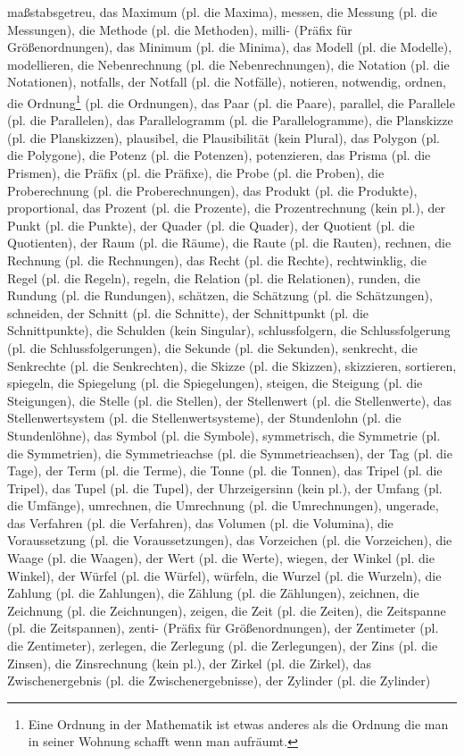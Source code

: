 maßstabsgetreu,
das Maximum (pl. die Maxima),
messen,
die Messung (pl. die Messungen),
die Methode (pl. die Methoden),
milli- (Präfix für Größenordnungen),
das Minimum (pl. die Minima),
das Modell (pl. die Modelle),
modellieren,
die Nebenrechnung (pl. die Nebenrechnungen),
die Notation (pl. die Notationen),
notfalls,
der Notfall (pl. die Notfälle),
notieren,
notwendig,
ordnen,
die Ordnung\footnote{Eine Ordnung in der Mathematik ist etwas anderes als die Ordnung die man in seiner Wohnung schafft wenn man aufräumt.} (pl. die Ordnungen),
das Paar (pl. die Paare),
parallel,
die Parallele (pl. die Parallelen),
das Parallelogramm (pl. die Parallelogramme),
die Planskizze (pl. die Planskizzen),
plausibel,
die Plausibilität (kein Plural),
das Polygon (pl. die Polygone),
die Potenz (pl. die Potenzen),
potenzieren,
das Prisma (pl. die Prismen),
die Präfix (pl. die Präfixe),
die Probe (pl. die Proben),
die Proberechnung (pl. die Proberechnungen),
das Produkt (pl. die Produkte),
proportional,
das Prozent (pl. die Prozente),
die Prozentrechnung (kein pl.),
der Punkt (pl. die Punkte),
der Quader (pl. die Quader),
der Quotient (pl. die Quotienten),
der Raum (pl. die Räume),
die Raute (pl. die Rauten),
rechnen,
die Rechnung (pl. die Rechnungen),
das Recht (pl. die Rechte),
rechtwinklig,
die Regel (pl. die Regeln),
regeln,
die Relation (pl. die Relationen),
runden,
die Rundung (pl. die Rundungen),
schätzen,
die Schätzung (pl. die Schätzungen),
schneiden,
der Schnitt (pl. die Schnitte),
der Schnittpunkt (pl. die Schnittpunkte),
die Schulden (kein Singular),
schlussfolgern,
die Schlussfolgerung (pl. die Schlussfolgerungen),
die Sekunde (pl. die Sekunden),
senkrecht,
die Senkrechte (pl. die Senkrechten),
die Skizze (pl. die Skizzen),
skizzieren,
sortieren,
spiegeln,
die Spiegelung (pl. die Spiegelungen),
steigen,
die Steigung (pl. die Steigungen),
die Stelle (pl. die Stellen),
der Stellenwert (pl. die Stellenwerte),
das Stellenwertsystem (pl. die Stellenwertsysteme),
der Stundenlohn (pl. die Stundenlöhne),
das Symbol (pl. die Symbole),
symmetrisch,
die Symmetrie (pl. die Symmetrien),
die Symmetrieachse (pl. die Symmetrieachsen),
der Tag (pl. die Tage),
der Term (pl. die Terme),
die Tonne (pl. die Tonnen),
das Tripel (pl. die Tripel),
das Tupel (pl. die Tupel),
der Uhrzeigersinn (kein pl.),
der Umfang (pl. die Umfänge),
umrechnen,
die Umrechnung (pl. die Umrechnungen),
ungerade,
das Verfahren (pl. die Verfahren),
das Volumen (pl. die Volumina),
die Voraussetzung (pl. die Voraussetzungen),
das Vorzeichen (pl. die Vorzeichen),
die Waage (pl. die Waagen),
der Wert (pl. die Werte),
wiegen,
der Winkel (pl. die Winkel),
der Würfel (pl. die Würfel),
würfeln,
die Wurzel (pl. die Wurzeln),
die Zahlung (pl. die Zahlungen),
die Zählung (pl. die Zählungen),
zeichnen,
die Zeichnung (pl. die Zeichnungen),
zeigen,
die Zeit (pl. die Zeiten),
die Zeitspanne (pl. die Zeitspannen),
zenti- (Präfix für Größenordnungen),
der Zentimeter (pl. die Zentimeter),
zerlegen,
die Zerlegung (pl. die Zerlegungen),
der Zins (pl. die Zinsen),
die Zinsrechnung (kein pl.),
der Zirkel (pl. die Zirkel),
das Zwischenergebnis (pl. die Zwischenergebnisse),
der Zylinder (pl. die Zylinder) 